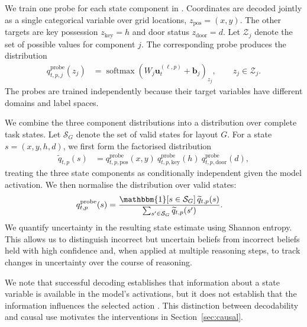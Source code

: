 \documentclass{article}
\begin{document}
We train one probe for each state component in . 
Coordinates are decoded jointly as a single categorical variable over grid locations, $z_{\mathrm{pos}}=(x,y)$. 
The other targets are key possession $z_{\mathrm{key}}=h$ and door status $z_{\mathrm{door}}=d$. 
Let $\mathcal Z_j$ denote the set of possible values for component $j$. The corresponding probe produces the distribution
\begin{align}
    q_{t,p,j}^{\mathrm{probe}}(z_j)
    &=
    \operatorname{softmax}
    \left(
        W_j \mathbf{u}_{t}^{(\ell,p)} + \mathbf{b}_j
    \right)_{z_j},
    \qquad z_j \in \mathcal Z_j.
    \label{eq:component-probe}
\end{align}
The probes are trained independently because their target variables have different domains and label spaces.

We combine the three component distributions into a distribution over complete task states.
Let $\mathcal S_G$ denote the set of valid states for layout $G$.
For a state $s=(x,y,h,d)$, we first form the factorised distribution
\begin{align}
    \widetilde q_{t,p}(s)
    &=
    q_{t,p,\mathrm{pos}}^{\mathrm{probe}}(x,y) \ 
    q_{t,p,\mathrm{key}}^{\mathrm{probe}}(h) \ 
    q_{t,p,\mathrm{door}}^{\mathrm{probe}}(d),
    \label{eq:factorised-probe-belief}
\end{align}
treating the three state components as conditionally independent given the model activation. 
We then normalise the distribution over valid states:
\begin{align}
    q^{\mathrm{probe}}_{t,p}(s)
    &=
    \frac{
        \mathbbm{1}[s \in \mathcal S_G]\,\widetilde q_{t,p}(s)
    }{
        \sum_{s' \in \mathcal S_G} \widetilde q_{t,p}(s')
    }.
    \label{eq:joint-probe-belief}
\end{align}
We quantify uncertainty in the resulting state estimate using Shannon entropy.
This allows us to distinguish incorrect but uncertain beliefs from incorrect beliefs held with high confidence and, when applied at multiple reasoning steps, to track changes in uncertainty over the course of reasoning.

We note that successful decoding establishes that information about a state variable is available in the model's activations, but it does not establish that the information influences the selected action \cite{elazar2021amnesic,belinkov2022probing}.
This distinction between decodability and causal use motivates the interventions in Section~\ref{sec:causal}.
\end{document}

